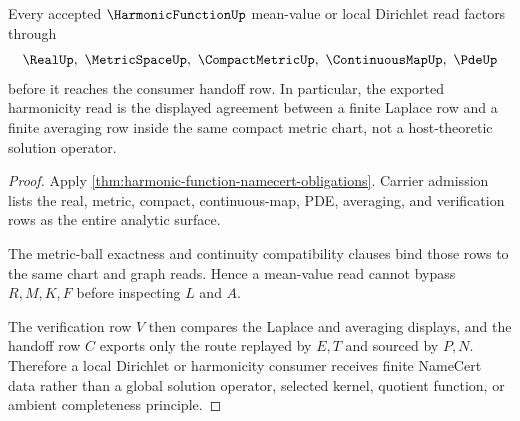 \begin{theorem}
\label{thm:harmonic-function-mean-value-route}
Every accepted $\HarmonicFunctionUp$ mean-value or local Dirichlet read factors through
$$
\RealUp,\ \MetricSpaceUp,\ \CompactMetricUp,\ \ContinuousMapUp,\ \PdeUp
$$
before it reaches the consumer handoff row. In particular, the exported harmonicity read is the displayed agreement between a finite Laplace row and a finite averaging row inside the same compact metric chart, not a host-theoretic solution operator.
\end{theorem}
\begin{proof}
Apply \autoref{thm:harmonic-function-namecert-obligations}. Carrier admission lists the real, metric, compact, continuous-map, PDE, averaging, and verification rows as the entire analytic surface.

The metric-ball exactness and continuity compatibility clauses bind those rows to the same chart and graph reads. Hence a mean-value read cannot bypass $R,M,K,F$ before inspecting $L$ and $A$.

The verification row $V$ then compares the Laplace and averaging displays, and the handoff row $C$ exports only the route replayed by $E,T$ and sourced by $P,N$. Therefore a local Dirichlet or harmonicity consumer receives finite NameCert data rather than a global solution operator, selected kernel, quotient function, or ambient completeness principle.
\end{proof}




